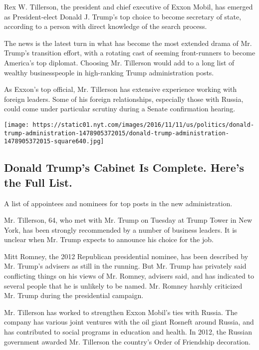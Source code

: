 Rex W. Tillerson, the president and chief executive of Exxon Mobil, has
emerged as President-elect Donald J. Trump's top choice to become
secretary of state, according to a person with direct knowledge of the
search process.

The news is the latest turn in what has become the most extended drama
of Mr. Trump's transition effort, with a rotating cast of seeming
front-runners to become America's top diplomat. Choosing Mr. Tillerson
would add to a long list of wealthy businesspeople in high-ranking Trump
administration posts.

As Exxon's top official, Mr. Tillerson has extensive experience working
with foreign leaders. Some of his foreign relationships, especially
those with Russia, could come under particular scrutiny during a Senate
confirmation hearing.

\href{https://www.nytimes.com/interactive/2016/us/politics/donald-trump-administration.html}{}

\texttt{[image: https://static01.nyt.com/images/2016/11/11/us/politics/donald-trump-administration-1478905372015/donald-trump-administration-1478905372015-square640.jpg]}

\hypertarget{donald-trumps-cabinet-is-complete-heres-the-full-list}{%
\subsection{Donald Trump's Cabinet Is Complete. Here's the Full
List.}\label{donald-trumps-cabinet-is-complete-heres-the-full-list}}

A list of appointees and nominees for top posts in the new
administration.

Mr. Tillerson, 64, who met with Mr. Trump on Tuesday at Trump Tower in
New York, has been strongly recommended by a number of business leaders.
It is unclear when Mr. Trump expects to announce his choice for the job.

Mitt Romney, the 2012 Republican presidential nominee, has been
described by Mr. Trump's advisers as still in the running. But Mr. Trump
has privately said conflicting things on his views of Mr. Romney,
advisers said, and has indicated to several people that he is unlikely
to be named. Mr. Romney harshly criticized Mr. Trump during the
presidential campaign.

Mr. Tillerson has worked to strengthen Exxon Mobil's ties with Russia.
The company has various joint ventures with the oil giant Rosneft around
Russia, and has contributed to social programs in education and health.
In 2012, the Russian government awarded Mr. Tillerson the country's
Order of Friendship decoration.

